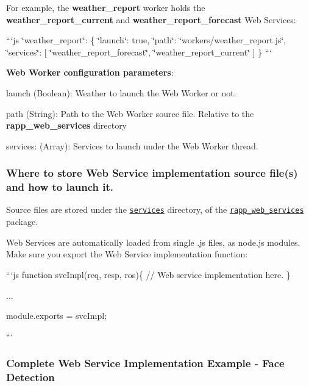 For example, the {\bfseries weather\-\_\-report} worker holds the {\bfseries weather\-\_\-report\-\_\-current} and {\bfseries weather\-\_\-report\-\_\-forecast} Web Services\-:

```js \char`\"{}weather\-\_\-report\char`\"{}\-: \{ \char`\"{}launch\char`\"{}\-: true, \char`\"{}path\char`\"{}\-: \char`\"{}workers/weather\-\_\-report.\-js\char`\"{}, \char`\"{}services\char`\"{}\-: \mbox{[} \char`\"{}weather\-\_\-report\-\_\-forecast\char`\"{}, \char`\"{}weather\-\_\-report\-\_\-current\char`\"{} \mbox{]} \} ```

{\bfseries Web Worker configuration parameters}\-:


\begin{DoxyItemize}
\item {\ttfamily launch} (Boolean)\-: Weather to launch the Web Worker or not.
\item {\ttfamily path} (String)\-: Path to the Web Worker source file. Relative to the {\bfseries rapp\-\_\-web\-\_\-services} directory
\item {\ttfamily services}\-: (Array)\-: Services to launch under the Web Worker thread.
\end{DoxyItemize}

\subsubsection*{Where to store Web Service implementation source file(s) and how to launch it.}

Source files are stored under the \href{https://github.com/rapp-project/rapp-platform/tree/master/rapp_web_services/services}{\tt services} directory, of the \href{https://github.com/rapp-project/rapp-platform/tree/master/rapp_web_services}{\tt rapp\-\_\-web\-\_\-services} package.

Web Services are automatically loaded from single .js files, as node.\-js modules. Make sure you export the Web Service implementation function\-:

```js function svc\-Impl(req, resp, ros)\{ // Web service implementation here. \}

...

module.\-exports = svc\-Impl;

```

\subsubsection*{Complete Web Service Implementation Example -\/ Face Detection}

